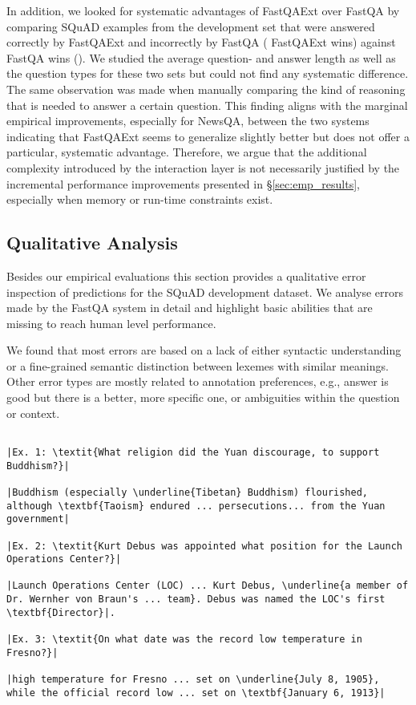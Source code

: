 \documentclass[11pt,a4paper]{article}
\begin{document}
In addition, we looked for systematic advantages of FastQAExt over FastQA by comparing SQuAD examples from the development set that were answered correctly by FastQAExt and incorrectly by FastQA ( FastQAExt wins) against FastQA wins (). We studied the average question- and answer length as well as the question types for these two sets but could not find any systematic difference. The same observation was made when manually comparing the kind of reasoning that is needed to answer a certain question. This finding aligns with the marginal empirical improvements, especially for NewsQA, between the two systems indicating that FastQAExt seems to generalize slightly better but does not offer a particular, systematic advantage. Therefore, we argue that the additional complexity introduced by the interaction layer is not necessarily justified by the incremental performance improvements presented in \S\ref{sec:emp_results}, especially when memory or run-time constraints exist.

\subsection{Qualitative Analysis}\label{sec:qual_ana}

Besides our empirical evaluations this section provides a qualitative error inspection of predictions for the SQuAD development dataset. We analyse  errors made by the FastQA system in detail and highlight basic abilities that are missing to reach human level performance.

We found that most errors are based on a lack of either syntactic understanding or a fine-grained semantic distinction between lexemes with similar meanings. Other error types are mostly related to annotation preferences, e.g., answer is good but there is a better, more specific one, or ambiguities within the question or context. 

\begin{mdframed}[roundcorner=2pt]
\small
\begin{lstlisting}[title={\small Example FastQA errors. Predicted answers are underlined while correct answers are presented in boldface.}]

|Ex. 1: \textit{What religion did the Yuan discourage, to support Buddhism?}|

|Buddhism (especially \underline{Tibetan} Buddhism) flourished, although \textbf{Taoism} endured ... persecutions... from the Yuan government|

|Ex. 2: \textit{Kurt Debus was appointed what position for the Launch Operations Center?}|

|Launch Operations Center (LOC) ... Kurt Debus, \underline{a member of Dr. Wernher von Braun's ... team}. Debus was named the LOC's first \textbf{Director}|.

|Ex. 3: \textit{On what date was the record low temperature in Fresno?}|

|high temperature for Fresno ... set on \underline{July 8, 1905}, while the official record low ... set on \textbf{January 6, 1913}|

\end{lstlisting}

\end{mdframed}
\end{document}
